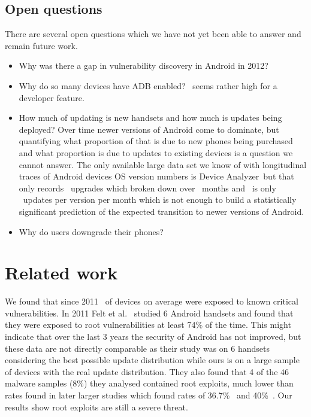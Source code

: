 \documentclass[conference,a4paper,twoside]{IEEEtran}
\newcommand{\da}{Device Analyzer}
\begin{document}
\subsection{Open questions}
There are several open questions which we have not yet been able to answer and remain future work.
\begin{itemize}
 \item Why was there a gap in vulnerability discovery in Android in 2012?
 \item Why do so many devices have ADB enabled? \daAdbEnabledPerc\ seems rather high for a developer feature.
 \item How much of updating is new handsets and how much is updates being deployed? Over time newer versions of Android come to dominate, but quantifying what proportion of that is due to new phones being purchased and what proportion is due to updates to existing devices is a question we cannot answer.
 The only available large data set we know of with longitudinal traces of Android devices OS version numbers is \da\ but that only records \daNumUpdatesUpgrades\ upgrades which broken down over \daOSMonthsOfData\ months and \daNumSigOSVersions\ is only \daUpdatesPerMonthPerVersion\ updates per version per month which is not enough to build a statistically significant prediction of the expected transition to newer versions of Android.
 \item Why do users downgrade their phones?
\end{itemize}


\section{Related work}
\label{sec:related}
We found that since 2011 \daMeanInsecurityPerc\ of devices on average were exposed to known critical vulnerabilities.
In 2011 Felt et al.\ \cite{Felt2011} studied 6 Android handsets and found that they were exposed to root vulnerabilities at least 74\% of the time.
This might indicate that over the last 3 years the security of Android has not improved, but these data are not directly comparable as their study was on 6 handsets considering the best possible update distribution while ours is on a large sample of devices with the real update distribution.
They also found that 4 of the 46 malware samples (8\%) they analysed contained root exploits, much lower than rates found in later larger studies which found rates of 36.7\%~\cite{Zhou2012b} and 40\%~\cite{Zhou2012a}.
Our results show root exploits are still a severe threat.
\end{document}
